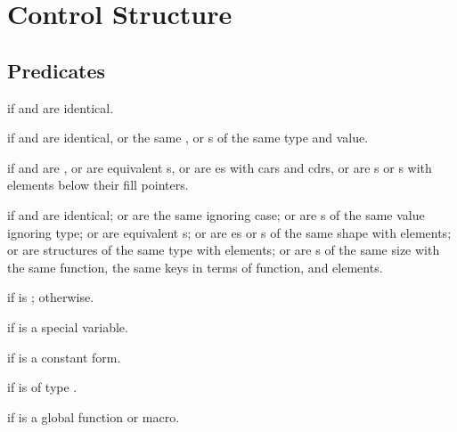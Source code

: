 % 
% 

\section{Control Structure}

\subsection{Predicates}
\begin{LIST}{1cm}

  {
    \retval{\T} if  and  are identical.
  }

  {
    \retval{\T} if  and 
    are identical, or the same , or s of the
    same type and value.
  }

  {
    \retval{\T} if  and 
    are , or are equivalent s, or are es with
     cars and cdrs, or are s or s with
     elements below their fill pointers.
  }

  {
    \retval{\T} if  and  are identical; or are the
    same  ignoring case; or are s of the same
    value ignoring type; or are equivalent s; or are
    es or s of the same shape with 
    elements; or are structures of the same type with
     elements; or are s of the same size
    with the same  function, the same keys in terms of
     function, and  elements.
  }

  {
    \retval{\T} if  is \NIL; \retval{\NIL} otherwise.
  }

  {
    \retval{\T} if  is a special variable.
  }

  {
    \retval{\T} if  is a constant form.
  }

  {
    \retval{\T} if  is of type .
  }

  {
    \retval{\T} if  is a global function or macro.
  }


\end{LIST}


